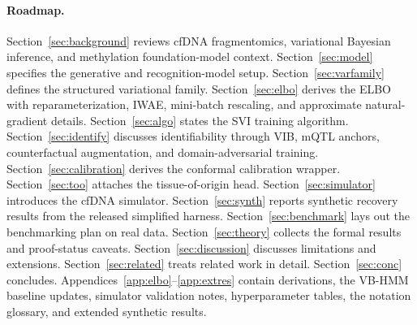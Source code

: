 \paragraph{Roadmap.} Section~\ref{sec:background} reviews cfDNA fragmentomics, variational Bayesian inference, and methylation foundation-model context. Section~\ref{sec:model} specifies the generative and recognition-model setup. Section~\ref{sec:varfamily} defines the structured variational family. Section~\ref{sec:elbo} derives the ELBO with reparameterization, IWAE, mini-batch rescaling, and approximate natural-gradient details. Section~\ref{sec:algo} states the SVI training algorithm. Section~\ref{sec:identify} discusses identifiability through VIB, mQTL anchors, counterfactual augmentation, and domain-adversarial training. Section~\ref{sec:calibration} derives the conformal calibration wrapper. Section~\ref{sec:too} attaches the tissue-of-origin head. Section~\ref{sec:simulator} introduces the cfDNA simulator. Section~\ref{sec:synth} reports synthetic recovery results from the released simplified harness. Section~\ref{sec:benchmark} lays out the benchmarking plan on real data. Section~\ref{sec:theory} collects the formal results and proof-status caveats. Section~\ref{sec:discussion} discusses limitations and extensions. Section~\ref{sec:related} treats related work in detail. Section~\ref{sec:conc} concludes. Appendices~\ref{app:elbo}--\ref{app:extres} contain derivations, the VB-HMM baseline updates, simulator validation notes, hyperparameter tables, the notation glossary, and extended synthetic results.
